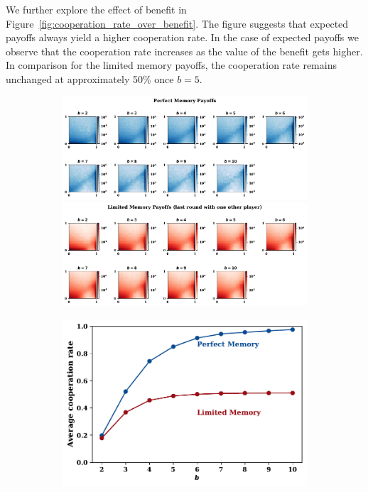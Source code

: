 \documentclass[11pt]{article}
\theoremstyle{plainCl1}
\theoremstyle{plainCl2}
\begin{document}
We further explore the effect of benefit in
Figure~\ref{fig:cooperation_rate_over_benefit}. The figure suggests that
expected payoffs always yield a higher cooperation rate. In the case of expected
payoffs we observe that the cooperation rate increases as the value of the
benefit gets higher. In comparison for the limited memory payoffs, the
cooperation rate remains unchanged at approximately 50\% once \(b=5\).

\begin{figure}[!htbp]
  \centering
  \begin{subfigure}{.5\textwidth}
    \centering
    \includegraphics[width=\textwidth]{static/expected_for_beta.pdf}
    \includegraphics[width=\textwidth]{static/stochastic_for_beta.pdf}
  \end{subfigure}%
  \begin{subfigure}{.5\textwidth}
    \centering
    \includegraphics[width=\textwidth]{static/cooperation_rate_over_b.pdf}

\end{subfigure}
\end{figure}
\end{document}
